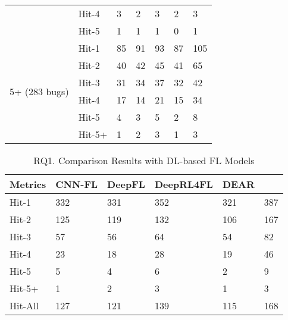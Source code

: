 \begin{table}[t]
{\begin{center}
\begin{tabular}{p{1.3cm}<{\centering}|p{0.8cm}<{\centering}|p{1cm}<{\centering}|p{0.8cm}<{\centering}|p{1.3cm}<{\centering}|p{1cm}<{\centering}|p{1.3cm}<{\centering}}
				& Hit-4     & 3 & 2 & 3 & 2& 3 \\
				& Hit-5     & 1 & 1 & 1 &0 & 1 \\
				\hline
				\multirow{6}{*}{5+ (283 bugs)}  & Hit-1 & 85 & 91 & 93 & 87 & 105 \\
				& Hit-2     & 40 & 42 & 45 & 41& 65 \\
				& Hit-3     & 31 & 34 & 37 & 32& 42 \\
				& Hit-4     & 17 & 14 & 21 & 15& 34 \\
				& Hit-5     & 4 & 3 & 5 & 2& 8 \\
				& Hit-5+    & 1 & 2 & 3 & 1& 3 \\
				\hline
			\end{tabular}
			
			\label{fig:rq1-details}
		\end{center}
	}
\end{table}

\begin{table}[t]
	\caption{RQ1. Comparison Results with DL-based FL Models}
	\vspace{-10pt}
	{\small
		\begin{center}
			\renewcommand{\arraystretch}{1}
			\begin{tabular}{p{1.2cm}<{\centering}|p{1cm}<{\centering}|p{0.8cm}<{\centering}|p{1.2cm}<{\centering}|p{1cm}<{\centering}|p{1.2cm}<{\centering}}
				\hline
				Metrics & CNN-FL & DeepFL & DeepRL4FL & DEAR & \tool \\			
				\hline
				Hit-1   & 332 & 331 & 352 & 321 & 387 \\
				Hit-2	& 125 & 119 & 132 & 106 & 167 \\
				Hit-3	& 57 & 56 & 64 & 54 & 82 \\
				Hit-4	& 23 & 18 & 28 & 19 & 46 \\
				Hit-5	& 5 & 4 & 6 & 2 & 9 \\
				Hit-5+	& 1 & 2 & 3 & 1 & 3 \\
                                Hit-All & 127  & 121  & 139  & 115 & 168\\
				\hline
			\end{tabular}
			
			\label{fig:rq1-overview}
		\end{center}
	}
\end{table}

